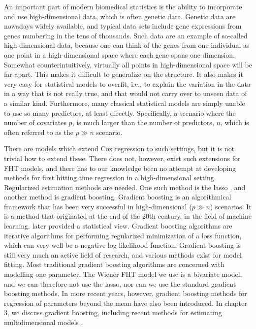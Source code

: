 An important part of modern biomedical statistics is the ability to incorporate and use high-dimensional data, which is often genetic data.
Genetic data are nowadays widely available, and typical data sets include gene expressions from genes numbering in the tens of thousands.
Such data are an example of so-called high-dimensional data, because one can think of the genes from one individual as one point in a high-dimensional space where each gene spans one dimension.
Somewhat counterintuitively, virtually all points in high-dimensional space will be far apart.
This makes it difficult to generalize on the structure.
It also makes it very easy for statistical models to overfit, i.e., to explain the variation in the data in a way that is not really true, and that would not carry over to unseen data of a similar kind.
Furthermore, many classical statistical models are simply unable to use so many predictors, at least directly.
Specifically, a scenario where the number of covariates $p$, is much larger than the number of predictors, $n$, which is often referred to as the $p\gg n$ scenario.

There are models which extend Cox regression to such settings, but it is not trivial how to extend these.
There does not, however, exist such extensions for FHT models, and there has to our knowledge been no attempt at developing methods for first hitting time regression in a high-dimensional setting.
Regularized estimation methods are needed.
One such method is the lasso \citep{lasso}, and another method is gradient boosting.
Gradient boosting is an algorithmical framework that has been very successful in high-dimensional ($p\gg n$) scenarios.
It is a method that originated at the end of the 20th century, in the field of machine learning.
\citet{friedman2001} later provided a statistical view.
Gradient boosting algorithms are iterative algorithms for performing regularized minimization of a loss function, which can very well be a negative log likelihood function.
Gradient boosting is still very much an active field of research, and various methods exist for model fitting.
Most traditional gradient boosting algorithms are concerned with modelling one parameter.
The Wiener FHT model we use is a bivariate model, and we can therefore not use the lasso, nor can we use the standard gradient boosting methods.
In more recent years, however, gradient boosting methods for regression of parameters beyond the mean have also been introduced.
In chapter 3, we discuss gradient boosting, including recent methods for estimating multidimensional models \citep{thomas2018}.

